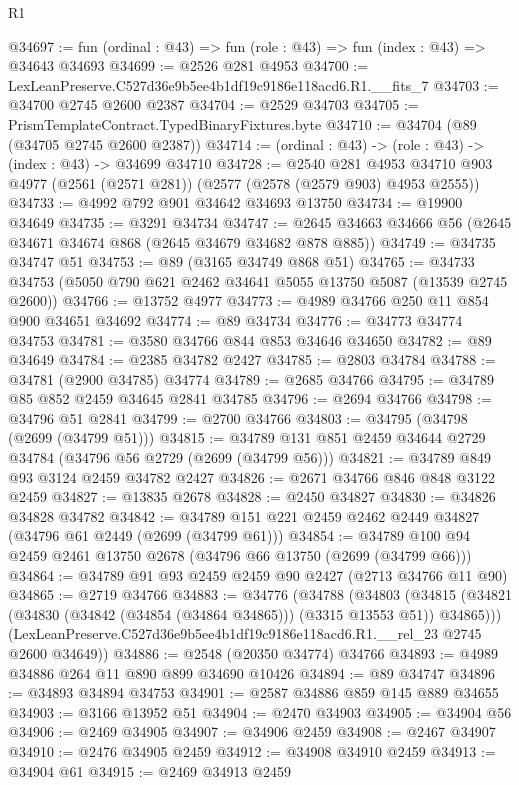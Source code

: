 \begin{lexlean}{R1}
\begin{coremodule}
@34697 := fun (ordinal : @43) => fun (role : @43) => fun (index : @43) => @34643 @34693
@34699 := @2526 @281 @4953
@34700 := LexLeanPreserve.C527d36e9b5ee4b1df19c9186e118acd6.R1.__fits_7
@34703 := @34700 @2745 @2600 @2387
@34704 := @2529 @34703
@34705 := PrismTemplateContract.TypedBinaryFixtures.byte
@34710 := @34704 (@89 (@34705 @2745 @2600 @2387))
@34714 := (ordinal : @43) -> (role : @43) -> (index : @43) -> @34699 @34710
@34728 := @2540
    @281
    @4953
    @34710
    @903
    @4977
    (@2561 (@2571 @281))
    (@2577 (@2578 (@2579 @903) @4953 @2555))
@34733 := @4992 @792 @901 @34642 @34693 @13750
@34734 := @19900 @34649
@34735 := @3291 @34734
@34747 := @2645 @34663 @34666 @56 (@2645 @34671 @34674 @868 (@2645 @34679 @34682 @878 @885))
@34749 := @34735 @34747 @51
@34753 := @89 (@3165 @34749 @868 @51)
@34765 := @34733 @34753 (@5050 @790 @621 @2462 @34641 @5055 @13750 @5087 (@13539 @2745 @2600))
@34766 := @13752 @4977
@34773 := @4989 @34766 @250 @11 @854 @900 @34651 @34692
@34774 := @89 @34734
@34776 := @34773 @34774 @34753
@34781 := @3580 @34766 @844 @853 @34646 @34650
@34782 := @89 @34649
@34784 := @2385 @34782 @2427
@34785 := @2803 @34784
@34788 := @34781 (@2900 @34785) @34774
@34789 := @2685 @34766
@34795 := @34789 @85 @852 @2459 @34645 @2841 @34785
@34796 := @2694 @34766
@34798 := @34796 @51 @2841
@34799 := @2700 @34766
@34803 := @34795 (@34798 (@2699 (@34799 @51)))
@34815 := @34789 @131 @851 @2459 @34644 @2729 @34784 (@34796 @56 @2729 (@2699 (@34799 @56)))
@34821 := @34789 @849 @93 @3124 @2459 @34782 @2427
@34826 := @2671 @34766 @846 @848 @3122 @2459
@34827 := @13835 @2678
@34828 := @2450 @34827
@34830 := @34826 @34828 @34782
@34842 := @34789 @151 @221 @2459 @2462 @2449 @34827 (@34796 @61 @2449 (@2699 (@34799 @61)))
@34854 := @34789 @100 @94 @2459 @2461 @13750 @2678 (@34796 @66 @13750 (@2699 (@34799 @66)))
@34864 := @34789 @91 @93 @2459 @2459 @90 @2427 (@2713 @34766 @11 @90)
@34865 := @2719 @34766
@34883 := @34776
    (@34788
      (@34803
        (@34815 (@34821 (@34830 (@34842 (@34854 (@34864 @34865))) (@3315 @13553 @51)) @34865)))
      (LexLeanPreserve.C527d36e9b5ee4b1df19c9186e118acd6.R1.__rel_23 @2745 @2600 @34649))
@34886 := @2548 (@20350 @34774) @34766
@34893 := @4989 @34886 @264 @11 @890 @899 @34690 @10426
@34894 := @89 @34747
@34896 := @34893 @34894 @34753
@34901 := @2587 @34886 @859 @145 @889 @34655
@34903 := @3166 @13952 @51
@34904 := @2470 @34903
@34905 := @34904 @56
@34906 := @2469 @34905
@34907 := @34906 @2459
@34908 := @2467 @34907
@34910 := @2476 @34905 @2459
@34912 := @34908 @34910 @2459
@34913 := @34904 @61
@34915 := @2469 @34913 @2459

\end{coremodule}
\end{lexlean}
